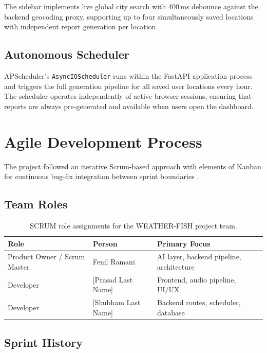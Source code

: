 \documentclass[11pt, a4paper]{article}
\begin{document}
The sidebar implements live global city search with 400\,ms debounce against the backend
geocoding proxy, supporting up to four simultaneously saved locations with independent
report generation per location.

\subsection{Autonomous Scheduler}

APScheduler's \texttt{AsyncIOScheduler} runs within the FastAPI application process and
triggers the full generation pipeline for all saved user locations every hour. The scheduler
operates independently of active browser sessions, ensuring that reports are always
pre-generated and available when users open the dashboard.

\section{Agile Development Process}

The project followed an iterative Scrum-based approach with elements of Kanban for
continuous bug-fix integration between sprint boundaries \citep{schwaber2020scrum}.

\subsection{Team Roles}

\begin{table}[H]
  \centering
  \caption{SCRUM role assignments for the WEATHER-FISH project team.}
  \label{tab:roles}
  \begin{tabularx}{\linewidth}{@{}lll X@{}}
    \toprule
    \textbf{Role}            & \textbf{Person}     & \textbf{Primary Focus} \\
    \midrule
    Product Owner / Scrum Master & Fenil Ramani    & AI layer, backend pipeline, architecture \\
    Developer                & [Prasad Last Name]  & Frontend, audio pipeline, UI/UX \\
    Developer                & [Shubham Last Name] & Backend routes, scheduler, database \\
    \bottomrule
  \end{tabularx}
\end{table}

\subsection{Sprint History}
\end{document}
